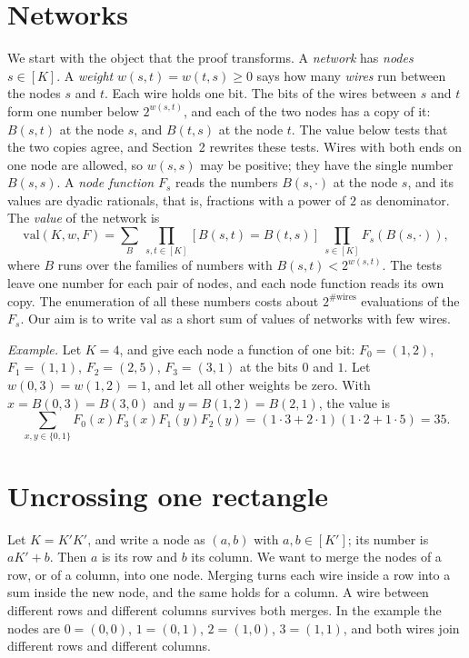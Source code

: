 \documentclass[11pt]{article}
\newcommand{\val}{\mathrm{val}}
\begin{document}
\section{Networks}\label{sec:net}

We start with the object that the proof transforms. A \emph{network} has \emph{nodes} $s\in[K]$. A \emph{weight} $w(s,t)=w(t,s)\ge0$ says how many \emph{wires} run between the nodes $s$ and $t$. Each wire holds one bit. The bits of the wires between $s$ and $t$ form one number below $2^{w(s,t)}$, and each of the two nodes has a copy of it: $B(s,t)$ at the node $s$, and $B(t,s)$ at the node $t$. The value below tests that the two copies agree, and Section~2 rewrites these tests. Wires with both ends on one node are allowed, so $w(s,s)$ may be positive; they have the single number $B(s,s)$. A \emph{node function} $F_s$ reads the numbers $B(s,\cdot)$ at the node $s$, and its values are dyadic rationals, that is, fractions with a power of $2$ as denominator. The \emph{value} of the network is
\[
\val(K,w,F)=\sum_{B}\ \prod_{s,t\in[K]}[B(s,t)=B(t,s)]\ \prod_{s\in[K]}F_s(B(s,\cdot)),
\]
where $B$ runs over the families of numbers with $B(s,t)<2^{w(s,t)}$. The tests leave one number for each pair of nodes, and each node function reads its own copy. The enumeration of all these numbers costs about $2^{\#\text{wires}}$ evaluations of the $F_s$. Our aim is to write $\val$ as a short sum of values of networks with few wires.

\emph{Example.} Let $K=4$, and give each node a function of one bit: $F_0=(1,2)$, $F_1=(1,1)$, $F_2=(2,5)$, $F_3=(3,1)$ at the bits $0$ and $1$. Let $w(0,3)=w(1,2)=1$, and let all other weights be zero. With $x=B(0,3)=B(3,0)$ and $y=B(1,2)=B(2,1)$, the value is
\[
\sum_{x,y\in\{0,1\}}F_0(x)F_3(x)F_1(y)F_2(y)=(1\cdot3+2\cdot1)(1\cdot2+1\cdot5)=35.
\]

\section{Uncrossing one rectangle}\label{sec:rect}

Let $K=K'K'$, and write a node as $(a,b)$ with $a,b\in[K']$; its number is $aK'+b$. Then $a$ is its row and $b$ its column. We want to merge the nodes of a row, or of a column, into one node. Merging turns each wire inside a row into a sum inside the new node, and the same holds for a column. A wire between different rows and different columns survives both merges. In the example the nodes are $0=(0,0)$, $1=(0,1)$, $2=(1,0)$, $3=(1,1)$, and both wires join different rows and different columns.
\end{document}
